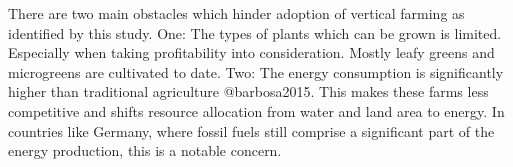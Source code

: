 There are two main obstacles which hinder adoption of vertical farming as identified by this study.
One: The types of plants which can be grown is limited.
Especially when taking profitability into consideration.
Mostly leafy greens and microgreens are cultivated to date. %
Two: The energy consumption is significantly higher than traditional agriculture @barbosa2015.
This makes these farms less competitive and shifts resource allocation from water and land area to energy.
In countries like Germany, where fossil fuels still comprise a significant part of the energy production, this is a notable concern.






